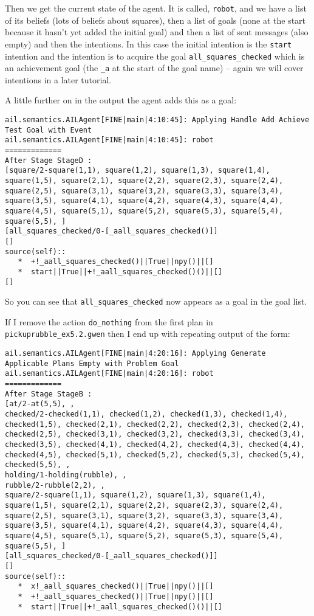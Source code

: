 Then we get the current state of the agent.  It is called, \texttt{robot}, and we have a list of its beliefs (lots of beliefs about squares), then a list of goals (none at the start because it hasn't yet added the initial goal) and then a list of sent messages (also empty) and then the intentions.  In this case the initial intention is the \texttt{start} intention and the intention is to acquire the goal \texttt{all\_squares\_checked} which is an achievement goal (the \texttt{\_a} at the start of the goal name) -- again we will cover intentions in a later tutorial.

A little further on in the output the agent adds this as a goal:
\begin{verbatim}
ail.semantics.AILAgent[FINE|main|4:10:45]: Applying Handle Add Achieve Test Goal with Event 
ail.semantics.AILAgent[FINE|main|4:10:45]: robot
=============
After Stage StageD :
[square/2-square(1,1), square(1,2), square(1,3), square(1,4), square(1,5), square(2,1), square(2,2), square(2,3), square(2,4), square(2,5), square(3,1), square(3,2), square(3,3), square(3,4), square(3,5), square(4,1), square(4,2), square(4,3), square(4,4), square(4,5), square(5,1), square(5,2), square(5,3), square(5,4), square(5,5), ]
[all_squares_checked/0-[_aall_squares_checked()]]
[]
source(self):: 
   *  +!_aall_squares_checked()||True||npy()||[]
   *  start||True||+!_aall_squares_checked()()||[]
[] 
\end{verbatim}
So you can see that \texttt{all\_squares\_checked} now appears as a goal in the goal list. 

If I remove the action \texttt{do\_nothing} from the first plan in \texttt{pickuprubble\_ex5.2.gwen} then I end up with repeating output of the form:

\begin{verbatim}
ail.semantics.AILAgent[FINE|main|4:20:16]: Applying Generate Applicable Plans Empty with Problem Goal 
ail.semantics.AILAgent[FINE|main|4:20:16]: robot
=============
After Stage StageB :
[at/2-at(5,5), , 
checked/2-checked(1,1), checked(1,2), checked(1,3), checked(1,4), checked(1,5), checked(2,1), checked(2,2), checked(2,3), checked(2,4), checked(2,5), checked(3,1), checked(3,2), checked(3,3), checked(3,4), checked(3,5), checked(4,1), checked(4,2), checked(4,3), checked(4,4), checked(4,5), checked(5,1), checked(5,2), checked(5,3), checked(5,4), checked(5,5), , 
holding/1-holding(rubble), , 
rubble/2-rubble(2,2), , 
square/2-square(1,1), square(1,2), square(1,3), square(1,4), square(1,5), square(2,1), square(2,2), square(2,3), square(2,4), square(2,5), square(3,1), square(3,2), square(3,3), square(3,4), square(3,5), square(4,1), square(4,2), square(4,3), square(4,4), square(4,5), square(5,1), square(5,2), square(5,3), square(5,4), square(5,5), ]
[all_squares_checked/0-[_aall_squares_checked()]]
[]
source(self):: 
   *  x!_aall_squares_checked()||True||npy()||[]
   *  +!_aall_squares_checked()||True||npy()||[]
   *  start||True||+!_aall_squares_checked()()||[]
\end{verbatim}

